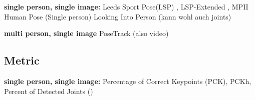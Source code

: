 \documentclass[twoside]{article}
\begin{document}
\begin{multicols}{2}
\textbf{single person, single image:} Leeds Sport Pose(LSP) \cite{johnson_clustered_2010}, LSP-Extended \cite{johnson_learning_2011}, MPII Human Pose (Single person) \cite{andriluka_2d_2014} Looking Into Person (kann wohl auch joints) \cite{gong_look_2017}

\textbf{multi person, single image} PoseTrack \cite{andriluka_posetrack:_2018} (also video)

\subsection{Metric}

\textbf{single person, single image:} Percentage of Correct Keypoints (PCK), PCKh, Percent of Detected Joints (\cite{toshev_deeppose:_2014})





\end{multicols}
\end{document}
